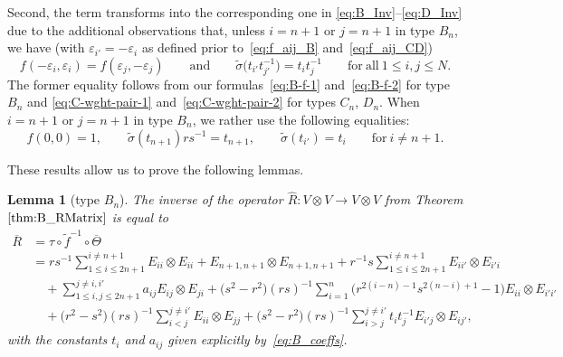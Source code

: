 \documentclass[10pt,a4paper]{amsart}
\numberwithin{equation}{section}
\newtheorem{Lemma}[Theorem]{Lemma}
\begin{document}
Second, the term  transforms into the corresponding one in \eqref{eq:B_Inv}--\eqref{eq:D_Inv} due to the additional observations that, unless $i = n + 1$ or $j = n + 1$ in type $B_{n}$, we have (with $\varepsilon_{i'}=-\varepsilon_{i}$ as defined prior to~\eqref{eq:f_aij_B} and~\eqref{eq:f_aij_CD})
\begin{displaymath}
 f(-\varepsilon_{i},\varepsilon_{i}) = f(\varepsilon_{j},-\varepsilon_{j})
 \qquad \text{and} \qquad \widetilde{\sigma}\bigl(t_{i'}t_{j'}^{-1}\bigr) = t_{i}t_{j}^{-1}
 \qquad \mathrm{for\ all} \ 1\leq i,j\leq N.
\end{displaymath}
The former equality follows from our formulas~\eqref{eq:B-f-1} and~\eqref{eq:B-f-2} for type $B_n$ and \eqref{eq:C-wght-pair-1} and~\eqref{eq:C-wght-pair-2} for types $C_n$, $D_n$. When $i=n+1$ or $j=n+1$ in type $B_n$, we rather use the following equalities:
\begin{displaymath}
 f(0,0) = 1,\qquad \widetilde{\sigma}(t_{n+1})rs^{-1} = t_{n+1},\qquad
 \widetilde{\sigma}(t_{i'}) = t_{i} \qquad \mathrm{for} \ i \neq n + 1.
\end{displaymath}

These results allow us to prove the following lemmas.

\begin{Lemma}[type $B_{n}$]\label{lem:B_Inverse}
The inverse of the operator $\hat{R}\colon V \otimes V \to V \otimes V$ from Theorem $\ref{thm:B_RMatrix}$ is equal to
\begin{align}
 \overline{R} &= \tau \circ \widetilde{f}^{-1} \circ \overline{\Theta} \nonumber\\
 &= rs^{-1}\sum_{1\leq i\leq 2n+1}^{i\ne n+1} E_{ii} \otimes E_{ii} + E_{n+1,n+1} \otimes E_{n+1,n+1} +
 r^{-1}s \sum_{1\leq i\leq 2n+1}^{i\ne n+1} E_{ii'} \otimes E_{i'i} \nonumber\\
 &\quad + \sum_{1\leq i,j\leq 2n+1}^{j\ne i,i'} a_{ij} E_{ij} \otimes E_{ji}
 + \bigl(s^{2} - r^{2}\bigr)(rs)^{-1}\sum_{i = 1}^{n}\bigl(r^{2(i - n) - 1}s^{2(n-i) + 1} - 1\bigr) E_{ii} \otimes E_{i'i'} \nonumber\\
 &\quad + \bigl(r^{2} - s^{2}\bigr)(rs)^{-1} \sum_{i<j}^{j\ne i'} E_{ii} \otimes E_{jj}
 + \bigl(s^{2} - r^{2}\bigr)(rs)^{-1}\sum_{i > j}^{j \ne i'} t_{i}t_{j}^{-1}E_{i'j} \otimes E_{ij'},\label{eq:B_Inv}
\end{align}
with the constants $t_{i}$ and $a_{ij}$ given explicitly by~\eqref{eq:B_coeffs}.
\end{Lemma}
\end{document}
